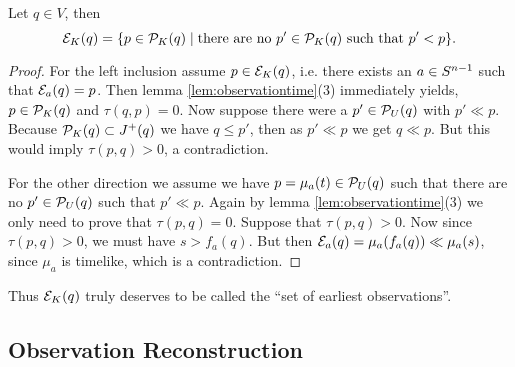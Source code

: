 \begin{proposition}\label{prop:seocharact}
Let $q\in V$, then 
\begin{equation*}
    \mc{E}_K(q) = \{ p \in \P_K(q) \mid \text{there are no $p'\in \P_K(q)$ such that $p' < p$} \}.
\end{equation*}
\end{proposition}
\begin{proof}
For the left inclusion assume $p\in \mc{E}_K(q)$, i.e. there exists an $a\in \sn$ such that $\mc{E}_a(q)=p$. Then lemma \ref{lem:observationtime}(3) immediately yields, $p\in \P_K(q)$ and  $\tau(q,p)=0$. Now suppose there were a $p'\in \P_U(q)$ with $p'\ll p$. Because $\P_K(q)\subset J^+(q)$ we have $q\leq p'$, then as $p'\ll p$ we get $q\ll p$. But this would imply $\tau(p,q)>0$, a contradiction.

For the other direction we assume we have $p=\mu_a(t) \in \P_U(q)$ such that there are no $p'\in\P_U(q)$ such that $p'\ll p$. Again by lemma \ref{lem:observationtime}(3) we only need to prove that $\tau(p,q)=0$. Suppose that $\tau(p,q)>0$. Now since $\tau(p,q)>0$, we must have $s > f_a(q)$. But then $\mc{E}_a(q) = \mu_a(f_a(q)) \ll  \mu_a(s)$, since $\mu_a$ is timelike, which is a contradiction.
\end{proof}
Thus $\mc{E}_K(q)$ truly deserves to be called the \enquote{set of earliest observations}.

\subsection{Observation Reconstruction}

